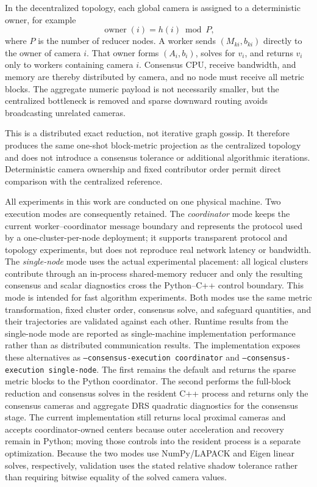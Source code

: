 In the decentralized topology, each global camera is assigned to a
deterministic owner, for example
\begin{equation}
  \operatorname{owner}(i)=h(i)\bmod P,
\end{equation}
where $P$ is the number of reducer nodes.  A worker sends $(M_{ki},b_{ki})$
directly to the owner of camera $i$.  That owner forms $(A_i,b_i)$, solves for
$v_i$, and returns $v_i$ only to workers containing camera $i$.  Consensus CPU,
receive bandwidth, and memory are thereby distributed by camera, and no node
must receive all metric blocks.  The aggregate numeric payload is not
necessarily smaller, but the centralized bottleneck is removed and sparse
downward routing avoids broadcasting unrelated cameras.

This is a distributed exact reduction, not iterative graph gossip.  It
therefore produces the same one-shot block-metric projection as the centralized
topology and does not introduce a consensus tolerance or additional algorithmic
iterations.  Deterministic camera ownership and fixed contributor order permit
direct comparison with the centralized reference.

All experiments in this work are conducted on one physical machine.  Two
execution modes are consequently retained.  The \emph{coordinator} mode keeps
the current worker--coordinator message boundary and represents the protocol
used by a one-cluster-per-node deployment; it supports transparent protocol and
topology experiments, but does not reproduce real network latency or bandwidth.
The \emph{single-node} mode uses the actual experimental placement: all logical
clusters contribute through an in-process shared-memory reducer and only the
resulting consensus and scalar diagnostics cross the Python--C++ control
boundary.  This mode is intended for fast algorithm experiments.  Both modes
use the same metric transformation, fixed cluster order, consensus solve, and
safeguard quantities, and their trajectories are validated against each other.
Runtime results from the single-node mode are reported as single-machine
implementation performance rather than as distributed communication results.
The implementation exposes these alternatives as
\texttt{--consensus-execution coordinator} and
\texttt{--consensus-execution single-node}.  The first remains the default and
returns the sparse metric blocks to the Python coordinator.  The second performs
the full-block reduction and consensus solves in the resident C++ process and
returns only the consensus cameras and aggregate DRS quadratic diagnostics for
the consensus stage.  The current implementation still returns local proximal
cameras and accepts coordinator-owned centers because outer acceleration and
recovery remain in Python; moving those controls into the resident process is a
separate optimization.
Because the two modes use NumPy/LAPACK and Eigen linear solves, respectively,
validation uses the stated relative shadow tolerance rather than requiring
bitwise equality of the solved camera values.

